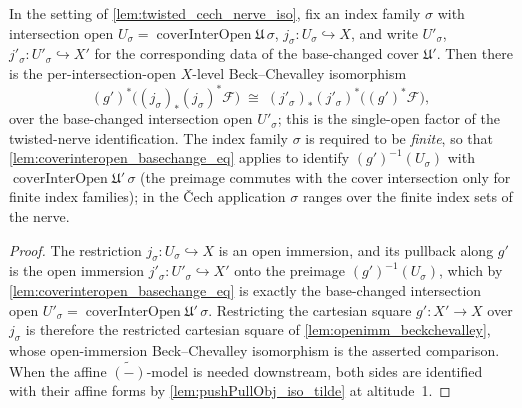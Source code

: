 \begin{lemma}\leanok
  \label{lem:twisted_cech_nerve_per_sigma}
  In the setting of \cref{lem:twisted_cech_nerve_iso}, fix an index family \(\sigma\) with
  intersection open \(U_\sigma = \operatorname{coverInterOpen}\mathfrak{U}\,\sigma\),
  \(j_\sigma : U_\sigma \hookrightarrow X\), and write \(U'_\sigma\),
  \(j'_\sigma : U'_\sigma \hookrightarrow X'\) for the corresponding data of the base-changed
  cover \(\mathfrak{U}'\). Then there is the per-intersection-open \(X\)-level Beck--Chevalley
  isomorphism
  \[
    (g')^*\bigl((j_\sigma)_* (j_\sigma)^*\mathcal{F}\bigr)
      \;\cong\;
    (j'_\sigma)_* (j'_\sigma)^*\bigl((g')^*\mathcal{F}\bigr),
  \]
  over the base-changed intersection open \(U'_\sigma\); this is the single-open factor of the
  twisted-nerve identification. The index family \(\sigma\) is required to be \emph{finite}, so
  that \cref{lem:coverinteropen_basechange_eq} applies to identify
  \((g')^{-1}(U_\sigma)\) with \(\operatorname{coverInterOpen}\mathfrak{U}'\,\sigma\) (the
  preimage commutes with the cover intersection only for finite index families); in the
  {\v C}ech application \(\sigma\) ranges over the finite index sets of the nerve.
\end{lemma}
\begin{proof}\leanok
  The restriction \(j_\sigma : U_\sigma \hookrightarrow X\) is an open immersion, and its
  pullback along \(g'\) is the open immersion \(j'_\sigma : U'_\sigma \hookrightarrow X'\) onto
  the preimage \((g')^{-1}(U_\sigma)\), which by \cref{lem:coverinteropen_basechange_eq} is
  exactly the base-changed intersection open
  \(U'_\sigma = \operatorname{coverInterOpen}\mathfrak{U}'\,\sigma\). Restricting the cartesian
  square \(g' : X' \to X\) over \(j_\sigma\) is therefore the restricted cartesian square of
  \cref{lem:openimm_beckchevalley}, whose open-immersion Beck--Chevalley isomorphism is the
  asserted comparison. When the affine \(\widetilde{(-)}\)-model is needed downstream, both
  sides are identified with their affine forms by \cref{lem:pushPullObj_iso_tilde} at
  altitude~1.
\end{proof}

